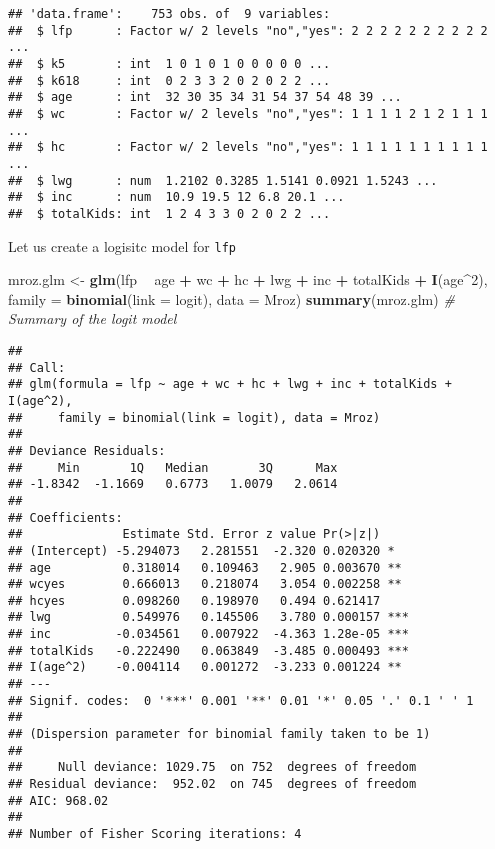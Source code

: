 \documentclass[]{article}
\newenvironment{Shaded}{\begin{snugshade}}{\end{snugshade}}
\newcommand{\CommentTok}[1]{\textcolor[rgb]{0.56,0.35,0.01}{\textit{#1}}}
\newcommand{\DataTypeTok}[1]{\textcolor[rgb]{0.13,0.29,0.53}{#1}}
\newcommand{\DecValTok}[1]{\textcolor[rgb]{0.00,0.00,0.81}{#1}}
\newcommand{\KeywordTok}[1]{\textcolor[rgb]{0.13,0.29,0.53}{\textbf{#1}}}
\newcommand{\NormalTok}[1]{#1}
\newcommand{\OperatorTok}[1]{\textcolor[rgb]{0.81,0.36,0.00}{\textbf{#1}}}
\newcommand{\StringTok}[1]{\textcolor[rgb]{0.31,0.60,0.02}{#1}}
\begin{document}
\begin{verbatim}
## 'data.frame':    753 obs. of  9 variables:
##  $ lfp      : Factor w/ 2 levels "no","yes": 2 2 2 2 2 2 2 2 2 2 ...
##  $ k5       : int  1 0 1 0 1 0 0 0 0 0 ...
##  $ k618     : int  0 2 3 3 2 0 2 0 2 2 ...
##  $ age      : int  32 30 35 34 31 54 37 54 48 39 ...
##  $ wc       : Factor w/ 2 levels "no","yes": 1 1 1 1 2 1 2 1 1 1 ...
##  $ hc       : Factor w/ 2 levels "no","yes": 1 1 1 1 1 1 1 1 1 1 ...
##  $ lwg      : num  1.2102 0.3285 1.5141 0.0921 1.5243 ...
##  $ inc      : num  10.9 19.5 12 6.8 20.1 ...
##  $ totalKids: int  1 2 4 3 3 0 2 0 2 2 ...
\end{verbatim}

Let us create a logisitc model for \texttt{lfp}

\begin{Shaded}
\begin{Highlighting}[]
\NormalTok{mroz.glm <-}\StringTok{ }\KeywordTok{glm}\NormalTok{(lfp }\OperatorTok{~}\StringTok{ }\NormalTok{age }\OperatorTok{+}\StringTok{ }\NormalTok{wc }\OperatorTok{+}\StringTok{ }\NormalTok{hc }\OperatorTok{+}\StringTok{ }\NormalTok{lwg }\OperatorTok{+}\StringTok{ }\NormalTok{inc }\OperatorTok{+}\StringTok{ }\NormalTok{totalKids }\OperatorTok{+}\StringTok{ }\KeywordTok{I}\NormalTok{(age}\OperatorTok{^}\DecValTok{2}\NormalTok{), }\DataTypeTok{family =} \KeywordTok{binomial}\NormalTok{(}\DataTypeTok{link =}\NormalTok{ logit), }\DataTypeTok{data =}\NormalTok{ Mroz)}
\KeywordTok{summary}\NormalTok{(mroz.glm) }\CommentTok{# Summary of the logit model}
\end{Highlighting}
\end{Shaded}

\begin{verbatim}
## 
## Call:
## glm(formula = lfp ~ age + wc + hc + lwg + inc + totalKids + I(age^2), 
##     family = binomial(link = logit), data = Mroz)
## 
## Deviance Residuals: 
##     Min       1Q   Median       3Q      Max  
## -1.8342  -1.1669   0.6773   1.0079   2.0614  
## 
## Coefficients:
##              Estimate Std. Error z value Pr(>|z|)    
## (Intercept) -5.294073   2.281551  -2.320 0.020320 *  
## age          0.318014   0.109463   2.905 0.003670 ** 
## wcyes        0.666013   0.218074   3.054 0.002258 ** 
## hcyes        0.098260   0.198970   0.494 0.621417    
## lwg          0.549976   0.145506   3.780 0.000157 ***
## inc         -0.034561   0.007922  -4.363 1.28e-05 ***
## totalKids   -0.222490   0.063849  -3.485 0.000493 ***
## I(age^2)    -0.004114   0.001272  -3.233 0.001224 ** 
## ---
## Signif. codes:  0 '***' 0.001 '**' 0.01 '*' 0.05 '.' 0.1 ' ' 1
## 
## (Dispersion parameter for binomial family taken to be 1)
## 
##     Null deviance: 1029.75  on 752  degrees of freedom
## Residual deviance:  952.02  on 745  degrees of freedom
## AIC: 968.02
## 
## Number of Fisher Scoring iterations: 4
\end{verbatim}
\end{document}
